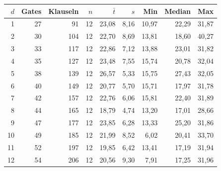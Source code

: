 \begin{tabular}{rrrrrrrrr}
\toprule
$d$ & Gates & Klauseln & $n$ & $\bar{t}$ & $s$ & Min & Median & Max \\
\midrule
1 & 27 & 91 & 12 & 23,08 & 8,16 & 10,97 & 22,29 & 31,87 \\
2 & 30 & 104 & 12 & 22,70 & 8,69 & 13,81 & 18,60 & 40,27 \\
3 & 33 & 117 & 12 & 22,86 & 7,12 & 13,88 & 23,01 & 31,82 \\
4 & 35 & 127 & 12 & 23,48 & 7,55 & 15,74 & 20,78 & 32,04 \\
5 & 38 & 139 & 12 & 26,57 & 5,33 & 15,75 & 27,43 & 32,05 \\
6 & 40 & 149 & 12 & 20,77 & 5,70 & 15,71 & 17,97 & 31,78 \\
7 & 42 & 157 & 12 & 22,76 & 6,06 & 15,81 & 22,40 & 31,89 \\
8 & 44 & 165 & 12 & 18,79 & 4,74 & 13,20 & 17,01 & 28,66 \\
9 & 47 & 177 & 12 & 23,85 & 6,28 & 13,33 & 25,20 & 31,86 \\
10 & 49 & 185 & 12 & 21,99 & 8,52 & 6,02 & 20,41 & 33,70 \\
11 & 52 & 197 & 12 & 19,85 & 6,42 & 13,41 & 17,19 & 31,94 \\
12 & 54 & 206 & 12 & 20,56 & 9,30 & 7,91 & 17,25 & 31,96 \\
\bottomrule
\end{tabular}
